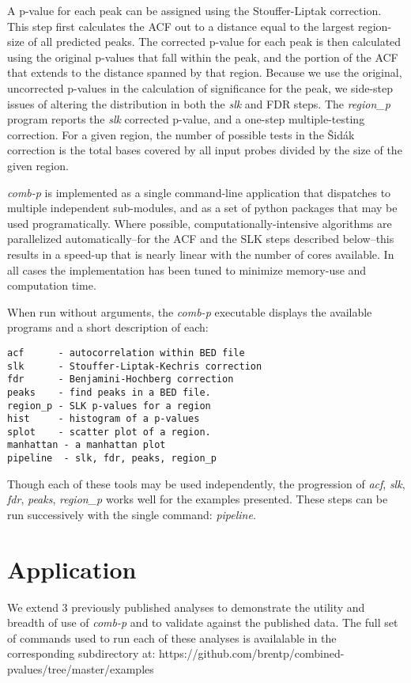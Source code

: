 \documentclass{bioinfo}
\begin{document}
\begin{methods}
A p-value for each peak can be assigned using the Stouffer-Liptak
correction. This step first calculates the ACF out to a distance
equal to the largest region-size of all predicted peaks. The corrected
p-value for each peak is then calculated using the original p-values
that fall within the peak, and the portion of the ACF that extends to
the distance spanned by that region. Because we use the original,
uncorrected p-values in the calculation of significance for the peak,
we side-step issues of altering the distribution in both the
\textit{slk} and FDR steps. The \textit{region\_p} program reports the
\textit{slk} corrected p-value, and a one-step \cite{Sidak}
multiple-testing correction.
For a given region, the number of possible tests
in the \v{S}id\'{a}k correction is the total bases covered by all input probes
divided by the size of the given region.

\textit{comb-p} is implemented as a single command-line application that
dispatches to multiple independent sub-modules, and as a set of python
packages that may be used programatically. Where possible,
computationally-intensive algorithms are parallelized
automatically--for the ACF and the SLK steps described below--this
results in a speed-up that is nearly linear with the number of cores available.
In all cases the implementation has been tuned to minimize memory-use and
computation time.

When run without arguments, the \textit{comb-p} executable displays the
available programs and a short description of each:
\begin{verbatim}
acf      - autocorrelation within BED file
slk      - Stouffer-Liptak-Kechris correction
fdr      - Benjamini-Hochberg correction
peaks    - find peaks in a BED file.
region_p - SLK p-values for a region
hist     - histogram of a p-values
splot    - scatter plot of a region.
manhattan - a manhattan plot
pipeline  - slk, fdr, peaks, region_p
\end{verbatim}

Though each of these tools may be used independently, the progression of
\textit{acf}, \textit{slk}, \textit{fdr}, \textit{peaks}, \textit{region\_p}
works well for the examples presented. These steps can
be run successively with the single command: \textit{pipeline}.

\section{Application}
We extend 3 previously published analyses to demonstrate the utility and
breadth of use of \textit{comb-p} and to validate against the
published data. The full set of commands used to run each of these analyses
is availalable in the corresponding subdirectory at:
https://github.com/brentp/combined-pvalues/tree/master/examples


\end{methods}
\end{document}
